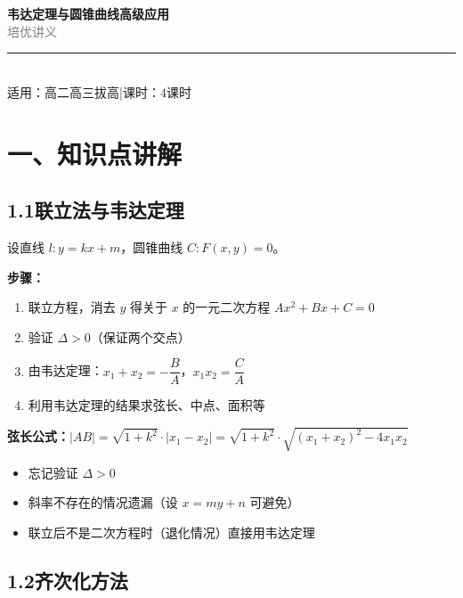 \documentclass[12pt, a4paper]{ctexart}
\begin{document}
\begin{center}
{\Huge\bfseries\textcolor{mainblue}{韦达定理与圆锥曲线高级应用}}\\[12pt]
{\Large\textcolor{gray}{培优讲义}}\\[8pt]
\rule{0.6\textwidth}{1pt}\\[8pt]
{\normalsize 适用：高二高三拔高\quad |\quad 课时：4课时}
\end{center}
\vspace{10pt}

\section*{\textcolor{mainblue}{一、知识点讲解}}

\subsection*{1.1\quad 联立法与韦达定理}

\begin{knowledgebox}[联立法基本步骤]
设直线 $l: y=kx+m$，圆锥曲线 $C: F(x,y)=0$。

\textbf{步骤：}
\begin{enumerate}[leftmargin=2em]
  \item 联立方程，消去 $y$ 得关于 $x$ 的一元二次方程 $Ax^2+Bx+C=0$
  \item 验证 $\Delta>0$（保证两个交点）
  \item 由韦达定理：$x_1+x_2=-\dfrac{B}{A}$，$x_1 x_2=\dfrac{C}{A}$
  \item 利用韦达定理的结果求弦长、中点、面积等
\end{enumerate}

\textbf{弦长公式：}$|AB|=\sqrt{1+k^2}\cdot|x_1-x_2|=\sqrt{1+k^2}\cdot\sqrt{(x_1+x_2)^2-4x_1 x_2}$
\end{knowledgebox}

\begin{warnbox}[联立法的常见陷阱]
\begin{itemize}[leftmargin=2em]
  \item 忘记验证 $\Delta>0$
  \item 斜率不存在的情况遗漏（设 $x=my+n$ 可避免）
  \item 联立后不是二次方程时（退化情况）直接用韦达定理
\end{itemize}
\end{warnbox}

\subsection*{1.2\quad 齐次化方法}
\end{document}
